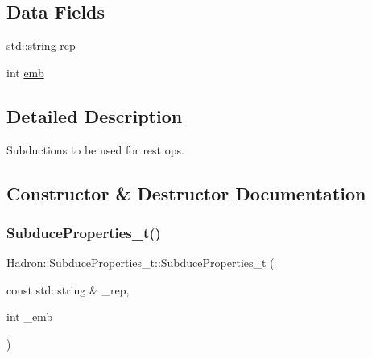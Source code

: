 \subsection*{Data Fields}
\begin{DoxyCompactItemize}
\item 
std\+::string \mbox{\hyperlink{structHadron_1_1SubduceProperties__t_a0983c7ff2504c5d4a32467371090f08d}{rep}}
\item 
int \mbox{\hyperlink{structHadron_1_1SubduceProperties__t_a3204da77d97084fac69eff126dcf6663}{emb}}
\end{DoxyCompactItemize}


\subsection{Detailed Description}
Subductions to be used for rest ops. 

\subsection{Constructor \& Destructor Documentation}
\mbox{\label{structHadron_1_1SubduceProperties__t_a265cb361b85b50a1619fda24fc575389}} 
\subsubsection{\texorpdfstring{SubduceProperties\_t()}{SubduceProperties\_t()}\hspace{0.1cm}{\footnotesize\ttfamily [1/3]}}
{\footnotesize\ttfamily Hadron\+::\+Subduce\+Properties\+\_\+t\+::\+Subduce\+Properties\+\_\+t (\begin{DoxyParamCaption}\item[{const std\+::string \&}]{\+\_\+rep,  }\item[{int}]{\+\_\+emb }\end{DoxyParamCaption})\hspace{0.3cm}{\ttfamily [inline]}}

\mbox{\label{structHadron_1_1SubduceProperties__t_a265cb361b85b50a1619fda24fc575389}} 
